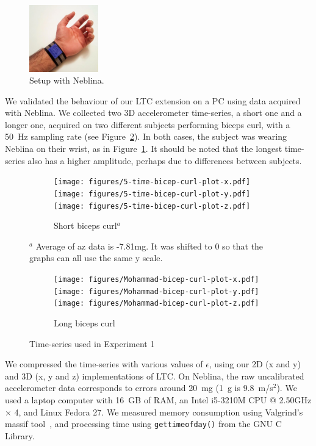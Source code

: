 \documentclass[10pt, conference, compsocconf]{IEEEtran}
\newcommand{\todo}[1]{\marginpar{\parbox{18mm}{\flushleft\tiny\color{red}\textbf{TODO}:
      #1}}}
\begin{document}
\begin{figure}
\includegraphics[width=3cm]{figures/neblina-wrist.png}
\caption{Setup with Neblina.}
\label{fig:neblina-wrist}
\end{figure}
We validated the behaviour of our LTC extension on a PC using data 
acquired with Neblina. We collected two 3D accelerometer time-series, a 
short one and a longer one, acquired on two different subjects 
performing biceps curl, with a 50~Hz sampling rate (see 
Figure~\ref{fig:datasets-1}). In both cases, the subject was wearing 
Neblina on their wrist, as in Figure~\ref{fig:neblina-wrist}. It should be noted that the longest
time-series also has a higher amplitude, perhaps due to differences between 
subjects.

\begin{figure}
\centering
\begin{subfigure}{1.85\columnwidth}
\centering
\texttt{[image: figures/5-time-bicep-curl-plot-x.pdf]}
\texttt{[image: figures/5-time-bicep-curl-plot-y.pdf]}
\texttt{[image: figures/5-time-bicep-curl-plot-z.pdf]}
\caption{Short biceps curl$^a$}
\end{subfigure}

{\footnotesize $^a$ Average 
of az data is -7.81mg. It was shifted to 0 so that the graphs can all 
use the same y scale.}

\begin{subfigure}{1.85\columnwidth}
\centering
\texttt{[image: figures/Mohammad-bicep-curl-plot-x.pdf]}
\texttt{[image: figures/Mohammad-bicep-curl-plot-y.pdf]}
\texttt{[image: figures/Mohammad-bicep-curl-plot-z.pdf]}
\caption{Long biceps curl}
\end{subfigure}

\caption{Time-series used in Experiment 1}
\label{fig:datasets-1}
\end{figure}

We compressed the time-series with various values of $\epsilon$, using 
our 2D (x and y) and 3D (x, y and z) implementations of LTC. On 
Neblina, the raw uncalibrated accelerometer data corresponds to errors 
around 20~mg (1~g is 9.8~m/s$^2$). We used a 
laptop computer with 16~GB of RAM, an Intel i5-3210M CPU @ 2.50GHz 
$\times$ 4, and Linux Fedora 27. We measured memory consumption using 
Valgrind's massif 
tool~\cite{nethercote2006building}, 
and processing time using \texttt{gettimeofday()} from the GNU C 
Library. 
\end{document}
